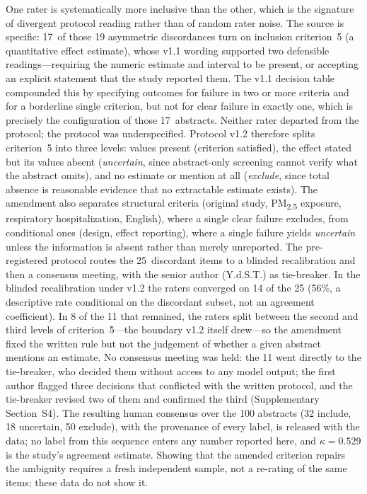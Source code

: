 \documentclass[preprint,review,12pt,authoryear]{elsarticle}
\begin{document}
One rater is systematically more inclusive than the other, which is the signature of divergent protocol reading rather than of random rater noise.
The source is specific: 17~of those 19 asymmetric discordances turn on inclusion criterion~5 (a quantitative effect estimate), whose v1.1 wording supported two defensible readings---requiring the numeric estimate and interval to be present, or accepting an explicit statement that the study reported them.
The v1.1 decision table compounded this by specifying outcomes for failure in two or more criteria and for a borderline single criterion, but not for clear failure in exactly one, which is precisely the configuration of those 17~abstracts.
Neither rater departed from the protocol; the protocol was underspecified.
Protocol v1.2 therefore splits criterion~5 into three levels: values present (criterion satisfied), the effect stated but its values absent (\emph{uncertain}, since abstract-only screening cannot verify what the abstract omits), and no estimate or mention at all (\emph{exclude}, since total absence is reasonable evidence that no extractable estimate exists).
The amendment also separates structural criteria (original study, PM\textsubscript{2.5} exposure, respiratory hospitalization, English), where a single clear failure excludes, from conditional ones (design, effect reporting), where a single failure yields \emph{uncertain} unless the information is absent rather than merely unreported.
The pre-registered protocol routes the 25~discordant items to a blinded recalibration and then a consensus meeting, with the senior author (Y.d.S.T.) as tie-breaker.
In the blinded recalibration under v1.2 the raters converged on 14 of the 25 (56\%, a descriptive rate conditional on the discordant subset, not an agreement coefficient).
In 8 of the 11 that remained, the raters split between the second and third levels of criterion~5---the boundary v1.2 itself drew---so the amendment fixed the written rule but not the judgement of whether a given abstract mentions an estimate.
No consensus meeting was held: the 11 went directly to the tie-breaker, who decided them without access to any model output; the first author flagged three decisions that conflicted with the written protocol, and the tie-breaker revised two of them and confirmed the third (Supplementary Section~S4).
The resulting human consensus over the 100 abstracts (32 include, 18 uncertain, 50 exclude), with the provenance of every label, is released with the data; no label from this sequence enters any number reported here, and $\kappa{=}0.529$ is the study's agreement estimate. Showing that the amended criterion repairs the ambiguity requires a fresh independent sample, not a re-rating of the same items; these data do not show it.
\end{document}
